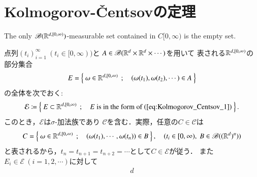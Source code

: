 \section{Kolmogorov-\v{C}entsovの定理}
	\begin{screen}
		\begin{thm}
			The only $\mathscr{B}(\mathbb{R}^{d,[0,\infty)})$-measurable set contained 
			in $C[0,\infty)$ is the empty set.
		\end{thm}
	\end{screen}
	
	\begin{prf}
				点列$(t_i)_{i=1}^{\infty}\ (t_i \in [0,\infty))$と
				$A \in \mathscr{B}(\mathbb{R}^d \times \mathbb{R}^d \times \cdots)$を用いて
				表される$\mathbb{R}^{d,[0,\infty)}$の部分集合
				\begin{align}
					E = \left\{\ \omega \in \mathbb{R}^{d,[0,\infty)}\ \, ; \quad (\omega(t_1),\omega(t_2),\cdots) \in A\ \right\}
					\label{eq:Kolmogorov_Centsov_1}
				\end{align}
				の全体を次でおく:
				\begin{align}
					\mathcal{E} \coloneqq
					\Set{E \subset \R^{d,[0,\infty)}}{
					\mbox{$E$ is in the form of (\refeq{eq:Kolmogorov_Centsov_1})}}.
				\end{align}
				このとき，$\mathcal{E}$は$\sigma$-加法族であり
				$\mathscr{C}$を含む．実際，任意の$C \in \mathscr{C}$は
				\begin{align}
					C = \left\{\ \omega \in \mathbb{R}^{d,[0,\infty)}\ \, ; \quad (\omega(t_1),\cdots,\omega(t_n)) \in B\ \right\},
					\quad (t_i \in [0,\infty),\ B \in \mathscr{B}((\mathbb{R}^d)^n))
				\end{align}
				と表されるから，$t_n = t_{n+1} = t_{n+2} = \cdots$として$C \in \mathcal{E}$が従う．
				また$E_i \in \mathcal{E}\ (i=1,2,\cdots)$に対して
				\begin{align}
					d
				\end{align}
				\QED
	\end{prf}
	
	